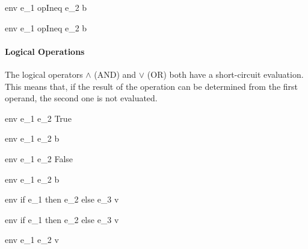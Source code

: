 \documentclass{article}
\begin{document}
\medskip

	{\mbox{env} \vdash e_1 \; opIneq \; e_2 \Downarrow b}
	
	{\mbox{env} \vdash e_1 \; opIneq \; e_2 \Downarrow b}

\paragraph{Logical Operations}
The logical operators $\wedge$ (AND) and $\vee$ (OR) both have a short-circuit evaluation. 
This means that, if the result of the operation can be determined from the first operand, the second one is not evaluated.
	
	{\mbox{env} \vdash e_1 \vee e_2 \Downarrow True}
	
	{\mbox{env} \vdash e_1 \vee e_2 \Downarrow b}
	
	{\mbox{env} \vdash e_1 \wedge e_2 \Downarrow False}
	
	{\mbox{env} \vdash e_1 \wedge e_2 \Downarrow b}
	
\bigskip
	
	{\mbox{env} \vdash if \; e_1\; then \; e_2 \; else \; e_3 \Downarrow v}
	
	{\mbox{env} \vdash if \; e_1\; then \; e_2 \; else \; e_3 \Downarrow v}
	
\bigskip

	{\mbox{env} \vdash e_1 \; e_2 \Downarrow v}
	
\end{document}
